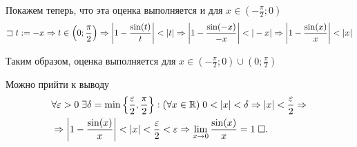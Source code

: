 \documentclass{article}
\begin{document}
Покажем теперь, что эта оценка выполняется и для $x\in(-\frac{\pi}{2};0)$
\begin{align*}
	\llet t:=-x\Rarr t\in\left(0;\frac{\pi}{2}\right)\Rarr \left|1-\frac{\sin(t)}{t}\right|<|t|\Rarr\left|1-\frac{\sin(-x)}{-x}\right|<|-x|\Rarr\left|1-\frac{\sin(x)}{x}\right|<|x|
\end{align*}

Таким образом, оценка выполняется для $x\in(-\frac{\pi}{2};0)\cup(0;\frac{\pi}{2})$

Можно прийти к выводу
\begin{align*}
	 & \forall\eps>0\;\exists\delta=\min\left\{\frac{\eps}{2},\frac{\pi}{2}\right\}:(\forall x\in\R)\;0<|x|<\delta\Rarr|x|<\frac{\eps}{2}\Rarr \\
	 & \Rarr \left|1-\frac{\sin(x)}{x}\right|<|x|<\frac{\eps}{2}<\eps\Rarr\slim{x\to 0}\frac{\sin(x)}{x}=1\qed
\end{align*}
\end{document}
